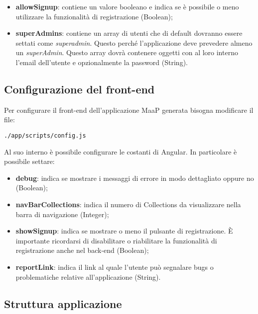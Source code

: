 \begin{itemize}
\item \textbf{allowSignup}: contiene un valore booleano e indica se è possibile o meno utilizzare la funzionalità di registrazione (Boolean);

\item \textbf{superAdmins}: contiene un array di utenti che di default dovranno essere settati come \textit{superadmin}. Questo perché l'applicazione deve prevedere almeno un \textit{superAdmin}. Questo array dovrà contenere oggetti con al loro interno l'email dell'utente e opzionalmente la password (String).

\end{itemize}

\subsection{Configurazione del front-end}

Per configurare il front-end dell'applicazione MaaP generata bisogna modificare il file:

\begin{center}
\texttt{./app/scripts/config.js}
\end{center} 

Al suo interno è possibile configurare le costanti di Angular. In particolare è possibile settare:

\begin{itemize}

	\item \textbf{debug}: indica se mostrare i messaggi di errore in modo dettagliato oppure no (Boolean);

	\item \textbf{navBarCollections}: indica il numero di Collections da visualizzare nella barra di navigazione (Integer);

	\item \textbf{showSignup}: indica se mostrare o meno il pulsante di registrazione. È importante ricordarsi di disabilitare o riabilitare la funzionalità di registrazione anche nel back-end (Boolean);

	\item \textbf{reportLink}: indica il link al quale l'utente può segnalare bugs o problematiche relative all'applicazione (String).

\end{itemize}


\subsection{Struttura applicazione}

